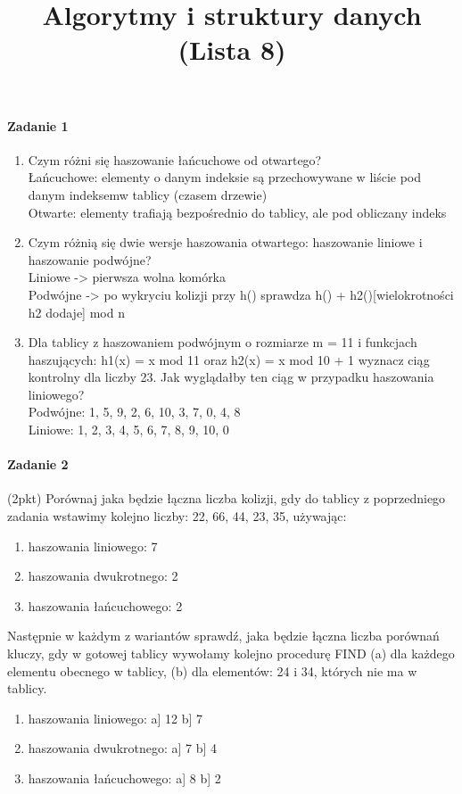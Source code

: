 \documentclass[18pt]{extarticle}
\begin{document}
\large
{}\selectfont

\title{Algorytmy i struktury danych (Lista 8)}
\date{}
\maketitle

\paragraph{Zadanie 1} 
\begin{enumerate}
    \item Czym różni się haszowanie łańcuchowe od otwartego? \\
        Łańcuchowe: elementy o danym indeksie są przechowywane w liście pod danym indeksemw  tablicy (czasem drzewie) \\
        Otwarte: elementy trafiają bezpośrednio do tablicy, ale pod obliczany indeks
    \item Czym różnią się dwie wersje haszowania otwartego: haszowanie liniowe i haszowanie podwójne? \\
        Liniowe -> pierwsza wolna komórka \\
        Podwójne -> po wykryciu kolizji przy h() sprawdza h() + h2()[wielokrotności h2 dodaje] mod n \\
    \item Dla tablicy z haszowaniem podwójnym o rozmiarze m = 11 i funkcjach haszujących: h1(x) = x mod 11 oraz h2(x) = x mod 10 + 1 wyznacz ciąg kontrolny dla liczby 23. Jak wyglądałby ten ciąg w przypadku haszowania liniowego? \\
        Podwójne: 1, 5, 9, 2, 6, 10, 3, 7, 0, 4, 8 \\
        Liniowe:  1, 2, 3, 4, 5, 6, 7, 8, 9, 10, 0 \\
\end{enumerate}

\paragraph{Zadanie 2} (2pkt) Porównaj jaka będzie łączna liczba kolizji, gdy do tablicy z poprzedniego zadania wstawimy kolejno liczby: 22, 66, 44, 23, 35, używając: 
\begin{enumerate}[label=(\alph*)]
    \item haszowania liniowego: 7
    \item haszowania dwukrotnego: 2
    \item haszowania łańcuchowego: 2
\end{enumerate}
Następnie w każdym z wariantów sprawdź, jaka będzie łączna liczba porównań kluczy, gdy w gotowej tablicy wywołamy kolejno procedurę FIND (a) dla każdego elementu obecnego w tablicy, (b) dla elementów: 24 i 34, których nie ma w tablicy.
\begin{enumerate}[label=(\alph*)]
    \item haszowania liniowego:     a] 12 b] 7
    \item haszowania dwukrotnego:   a] 7 b] 4
    \item haszowania łańcuchowego:  a] 8 b] 2
\end{enumerate}
\end{document}
